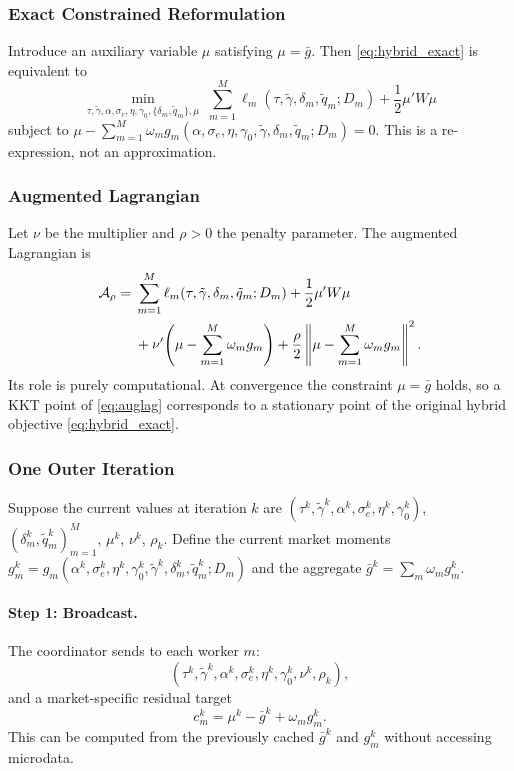 \documentclass[11pt]{article}
\begin{document}
\subsubsection{Exact Constrained Reformulation}

Introduce an auxiliary variable $\mu$ satisfying $\mu = \bar g$. Then \eqref{eq:hybrid_exact} is equivalent to
\begin{equation}\label{eq:hybrid_constrained}
\min_{\tau,\tilde\gamma,\alpha,\sigma_e,\eta,\gamma_0,\{\delta_m,\tilde q_m\},\mu}\;
\sum_{m=1}^M \ell_m(\tau,\tilde\gamma,\delta_m,\tilde q_m;D_m) + \frac{1}{2}\mu'W\mu
\end{equation}
subject to $\mu - \sum_{m=1}^M \omega_m g_m(\alpha,\sigma_e,\eta,\gamma_0,\tilde\gamma,\delta_m,\tilde q_m;D_m) = 0$. This is a re-expression, not an approximation.

\subsubsection{Augmented Lagrangian}

Let $\nu$ be the multiplier and $\rho>0$ the penalty parameter. The augmented Lagrangian is
\begin{align}
\mathcal A_\rho
=&\; \sum_{m=1}^M \ell_m(\tau,\tilde\gamma,\delta_m,\tilde q_m;D_m) + \frac{1}{2}\mu'W\mu \notag\\
&\; + \nu'\!\left(\mu - \sum_{m=1}^M \omega_m g_m\right) + \frac{\rho}{2}\left\|\mu - \sum_{m=1}^M \omega_m g_m\right\|^2.
\label{eq:auglag}
\end{align}
Its role is purely computational. At convergence the constraint $\mu = \bar g$ holds, so a KKT point of \eqref{eq:auglag} corresponds to a stationary point of the original hybrid objective \eqref{eq:hybrid_exact}.

\subsubsection{One Outer Iteration}\label{sec:outer_iter}

Suppose the current values at iteration $k$ are $(\tau^k,\tilde\gamma^k,\alpha^k,\sigma_e^k,\eta^k,\gamma_0^k)$, $(\delta_m^k,\tilde q_m^k)_{m=1}^M$, $\mu^k$, $\nu^k$, $\rho_k$. Define the current market moments $g_m^k = g_m(\alpha^k,\sigma_e^k,\eta^k,\gamma_0^k,\tilde\gamma^k,\delta_m^k,\tilde q_m^k;D_m)$ and the aggregate $\bar g^k = \sum_m \omega_m g_m^k$.

\paragraph{Step 1: Broadcast.} The coordinator sends to each worker $m$:
\[
(\tau^k,\tilde\gamma^k,\alpha^k,\sigma_e^k,\eta^k,\gamma_0^k,\nu^k,\rho_k),
\]
and a market-specific residual target
\begin{equation}\label{eq:cm}
c_m^k = \mu^k - \bar g^k + \omega_m g_m^k.
\end{equation}
This can be computed from the previously cached $\bar g^k$ and $g_m^k$ without accessing microdata.
\end{document}
